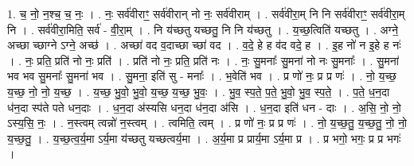 \documentclass[17pt]{extarticle}
\begin{document}
1. च॒ नो॒ न॒श्च॒ च॒ नः॒ । . नः॒ सर्व॑वीराꣳ॒॒ सर्व॑वीरान् नो नः॒ सर्व॑वीराम् । . सर्व॑वीरा॒म् नि नि सर्व॑वीराꣳ॒॒ सर्व॑वीरा॒म् नि । . सर्व॑वीरा॒मिति॒ सर्व॑ - वी॒रा॒म् । . नि य॑च्छतु यच्छतु॒ नि नि य॑च्छतु । . य॒च्छ॒त्विति॑ यच्छतु । . अग्ने॒ अच्छा च्छाग्ने ऽग्ने॒ अच्छ॑ । . अच्छा॑ वद व॒दाच्छा च्छा॑ वद । . व॒दे॒ हे ह व॑द वदे॒ ह । . इ॒ह नो॑ न इ॒हे ह नः॑ । . नः॒ प्रति॒ प्रति॑ नो नः॒ प्रति॑ । . प्रति॑ नो नः॒ प्रति॒ प्रति॑ नः । . नः॒ सु॒मनाः᳚ सु॒मना॑ नो नः सु॒मनाः᳚ । . सु॒मना॑ भव भव सु॒मनाः᳚ सु॒मना॑ भव । . सु॒मना॒ इति॑ सु - मनाः᳚ । . भ॒वेति॑ भव । . प्र णो॑ नः॒ प्र प्र णः॑ । . नो॒ य॒च्छ॒ य॒च्छ॒ नो॒ नो॒ य॒च्छ॒ । . य॒च्छ॒ भु॒वो॒ भु॒वो॒ य॒च्छ॒ य॒च्छ॒ भु॒वः॒ । . भु॒व॒ स्प॒ते॒ प॒ते॒ भु॒वो॒ भु॒व॒ स्प॒ते॒ । . प॒ते॒ ध॒न॒दा ध॑न॒दा स्प॑ते पते धन॒दाः । . ध॒न॒दा अ॑स्यसि धन॒दा ध॑न॒दा अ॑सि । . ध॒न॒दा इति॑ धन - दाः । . अ॒सि॒ नो॒ नो॒ ऽस्य॒सि॒ नः॒ । . न॒स्त्वम् त्वन्नो॑ न॒स्त्वम् । . त्वमिति॒ त्वम् । . प्र णो॑ नः॒ प्र प्र णः॑ । . नो॒ य॒च्छ॒तु॒ य॒च्छ॒तु॒ नो॒ नो॒ य॒च्छ॒तु॒ । . य॒च्छ॒त्व॒र्य॒मा ऽर्य॒मा य॑च्छतु यच्छत्वर्य॒मा । . अ॒र्य॒मा प्र प्रार्य॒मा ऽर्य॒मा प्र । . प्र भगो॒ भगः॒ प्र प्र भगः॑ । \newline
\end{document}
